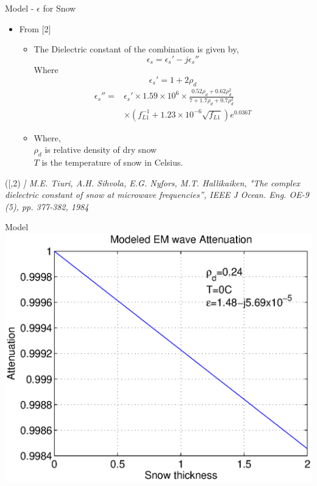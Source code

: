 \documentclass{beamer}
\newenvironment{reference}[2]{%
  \begin{textblock*}{\textwidth}(#1,#2) 
      \footnotesize\it\bgroup\color{red!50!black}}{\egroup\end{textblock*}}
\begin{document}
\begin{frame}{Model - $\epsilon$ for Snow}
\begin{itemize}
  \item From [2] 
    \begin{itemize}
      \item The Dielectric constant of the combination is given by,
        \begin{equation*}
          \epsilon_s = \epsilon_s'  - j\epsilon_s''
        \end{equation*}
        Where
        \begin{equation*}
            \epsilon_s' = 1 + 2 \rho_d
        \end{equation*}
        \begin{align*}
          \epsilon_s'' = &\epsilon_s' \times 1.59 \times 10^6 \times \frac{0.52\rho_d + 0.62\rho_d^2}{7 + 1.7\rho_d + 0.7\rho_d^2}\\
          & \times (f_{L1}^{-1} + 1.23 \times 10^{-6}\sqrt{f_{L1}})e^{0.036 T}
        \end{align*}
      \item Where, \\$\rho_d$ is relative density of dry snow \\$T$ is the temperature of snow in Celsius.
    \end{itemize}
\end{itemize}

\begin{reference}{4mm}{85mm}
 [2] M.E. Tiuri, A.H. Sihvola, E.G. Nyfors, M.T. Hallikaiken, "The complex dielectric constant of snow at microwave frequencies'', IEEE J Ocean. Eng. OE-9 (5), pp. 377-382, 1984
\end{reference}

\end{frame}

\begin{frame}{Model}
\includegraphics[width=1\linewidth]{model_1.eps}
\end{frame}
\end{document}
